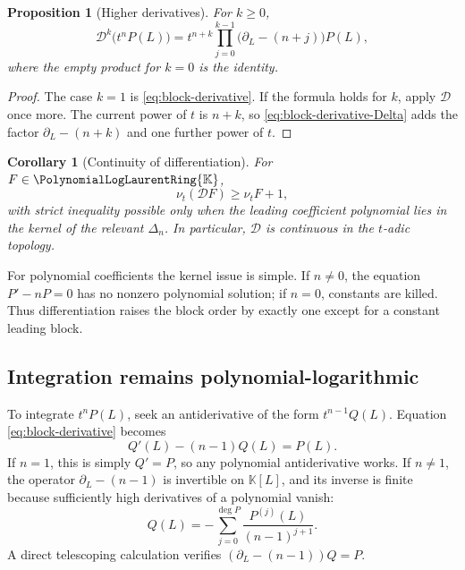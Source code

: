 \documentclass[11pt]{article}
\theoremstyle{pltheorem}
\newtheorem{proposition}[theorem]{Proposition}
\newtheorem{corollary}[theorem]{Corollary}
\newcommand{\K}{\mathbb K}
\newcommand{\PLL}{\PolynomialLogLaurentRing{\K}}
\newcommand{\ordt}{\nu_t}
\newcommand{\D}{\mathcal D}
\begin{document}
\begin{proposition}[Higher derivatives]\label{prop:higher-derivative}
For \(k\ge0\),
\begin{equation}\label{eq:higher-derivative}
 \D^k\bigl(t^nP(L)\bigr)
 =t^{n+k}
 \prod_{j=0}^{k-1}\bigl(\partial_L-(n+j)\bigr)P(L),
\end{equation}
where the empty product for \(k=0\) is the identity.
\end{proposition}

\begin{proof}
The case \(k=1\) is \cref{eq:block-derivative}.  If the formula holds for \(k\), apply \(\D\) once more.  The current power of \(t\) is \(n+k\), so \cref{eq:block-derivative-Delta} adds the factor
\(\partial_L-(n+k)\) and one further power of \(t\).
\end{proof}

\begin{corollary}[Continuity of differentiation]\label{cor:D-continuous}
For \(F\in\PLL\),
\begin{equation}\label{eq:D-order}
 \ordt(\D F)\ge\ordt F+1,
\end{equation}
with strict inequality possible only when the leading coefficient polynomial lies in the kernel of the relevant \(\Delta_n\).  In particular, \(\D\) is continuous in the \(t\)-adic topology.
\end{corollary}

For polynomial coefficients the kernel issue is simple.  If \(n\ne0\), the equation \(P'-nP=0\) has no nonzero polynomial solution; if \(n=0\), constants are killed.  Thus differentiation raises the block order by exactly one except for a constant leading block.

\subsection{Integration remains polynomial-logarithmic}

To integrate \(t^nP(L)\), seek an antiderivative of the form
\(t^{n-1}Q(L)\).  Equation \cref{eq:block-derivative} becomes
\begin{equation}\label{eq:antiderivative-equation}
 Q'(L)-(n-1)Q(L)=P(L).
\end{equation}
If \(n=1\), this is simply \(Q'=P\), so any polynomial antiderivative works.  If \(n\ne1\), the operator
\(\partial_L-(n-1)\) is invertible on \(\K[L]\), and its inverse is finite because sufficiently high derivatives of a polynomial vanish:
\begin{equation}\label{eq:Delta-inverse-polynomial}
 Q(L)=-\sum_{j=0}^{\deg P}
 \frac{P^{(j)}(L)}{(n-1)^{j+1}}.
\end{equation}
A direct telescoping calculation verifies
\((\partial_L-(n-1))Q=P\).
\end{document}
